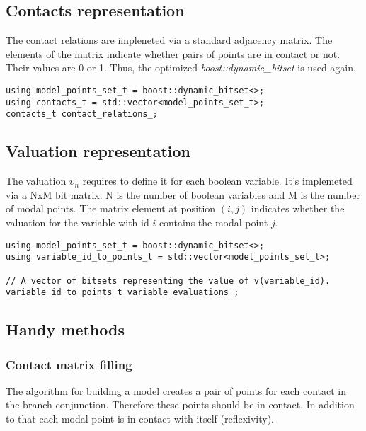 \documentclass{article}
\begin{document}
	\newpage
	\subsection{Contacts representation}
	The contact relations are impleneted via a standard adjacency matrix. The elements of the matrix indicate whether pairs of points are in contact or not. Their values are 0 or 1. Thus, the optimized \textit{boost::dynamic\_bitset} is used again.

\begin{lstlisting}
using model_points_set_t = boost::dynamic_bitset<>;
using contacts_t = std::vector<model_points_set_t>;
contacts_t contact_relations_;
\end{lstlisting}

	\subsection{Valuation representation}
	The valuation $\upsilon_n$ requires to define it for each boolean variable. It's implemeted via a NxM bit matrix. N is the number of boolean variables and M is the number of modal points. The matrix element at position $(i, j)$ indicates whether the valuation for the variable with id $i$ contains the modal point $j$.

\begin{lstlisting}
using model_points_set_t = boost::dynamic_bitset<>;
using variable_id_to_points_t = std::vector<model_points_set_t>;

// A vector of bitsets representing the value of v(variable_id).
variable_id_to_points_t variable_evaluations_;
\end{lstlisting}

	\subsection{Handy methods}
	\subsubsection*{Contact matrix filling}
	The algorithm for building a model creates a pair of points for each contact in the branch conjunction. Therefore these points should be in contact. In addition to that each modal point is in contact with itself (reflexivity).
\end{document}
